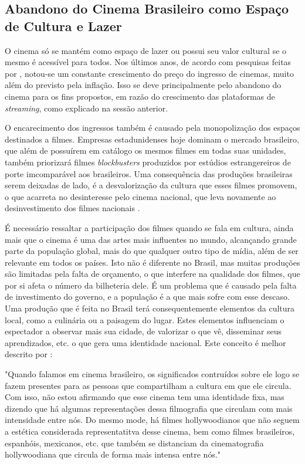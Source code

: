 \documentclass[
	article,			%
	12pt,				%
	oneside,			%
	a4paper,			%
	english,			%
	brazil,				%
	sumario=tradicional
	]{abntex2}
\begin{document}
\subsection{Abandono do Cinema Brasileiro como Espaço de Cultura e Lazer}

O cinema só se mantém como espaço de lazer ou possui seu valor cultural se o mesmo é acessível para todos. Nos últimos anos, de acordo com pesquisas feitas por , notou-se um constante crescimento do preço do ingresso de cinemas, muito além do previsto pela inflação. Isso se deve principalmente pelo abandono do cinema para os fins propostos, em razão do crescimento das plataformas de \textit{streaming}, como explicado na sessão anterior.

O encarecimento dos ingressos também é causado pela monopolização dos espaços destinados a filmes. Empresas estadunidenses hoje dominam o mercado brasileiro, que além de possuírem em catálogo os mesmos filmes em todas suas unidades, também priorizará filmes \textit{blockbusters} produzidos por estúdios estrangereiros de porte imcomparável aos brasileiros. Uma consequência das produções brasileiras serem deixadas de lado, é a desvalorização da cultura que esses filmes promovem, o que acarreta no desinteresse pelo cinema nacional, que leva novamente ao desinvestimento dos filmes nacionais \cite{BOTELHO}.

É necessário ressaltar a participação dos filmes quando se fala em cultura, ainda mais que o cinema é uma das artes mais influentes no mundo, alcançando grande parte da população global, mais do que qualquer outro tipo de mídia, além de ser relevante em todos os países. Isto não é diferente no Brasil, mas muitas produções são limitadas pela falta de orçamento, o que interfere na qualidade dos filmes, que por si afeta o número da bilheteria dele. É um problema que é causado pela falta de investimento do governo, e a população é a que mais sofre com esse descaso. Uma produção que é feita no Brasil terá consequentemente elementos da cultura local, como a culinária ou a paisagem do lugar. Estes elementos influenciam o espectador a observar mais sua cidade, de valorizar o que vê, disseminar seus aprendizados, etc. o que gera uma identidade nacional. Este conceito é melhor descrito por :

	\begin{citacao}
		"Quando falamos em cinema brasileiro, os significados contruídos sobre ele logo se fazem presentes para as pessoas que compartilham a cultura em que ele circula. Com isso, não estou afirmando que esse cinema tem uma identidade fixa, mas dizendo que há algumas representações dessa filmografia que circulam com mais intensidade entre nós. Do mesmo mode, há filmes hollywoodianos que não seguem a estética considerada representatitva desse cinema, bem como filmes brasileiros, espanhóis, mexicanos, etc. que também se distanciam da cinematografia hollywoodiana que circula de forma mais intensa entre nós." 
        \cite{HENN}
	\end{citacao}
\end{document}
